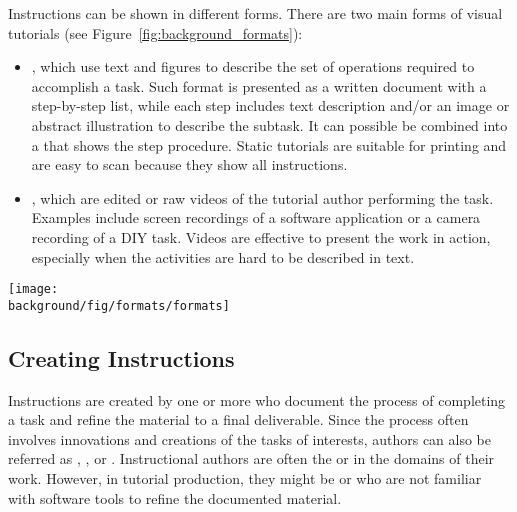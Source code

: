 Instructions can be shown in different forms. There are two main forms of visual tutorials (see Figure~\ref{fig:background_formats}):
\begin{itemize}
  \itemsep -2pt
  \item {}, which use text and figures to describe the set of operations required to accomplish a task. Such format is presented as a written document with a step-by-step list, while each step includes text description and/or an image or abstract illustration to describe the subtask. It can possible be combined into a  that shows the step procedure. Static tutorials are suitable for printing and are easy to scan because they show all instructions.
  \item {}, which are edited or raw videos of the tutorial author performing the task. Examples include screen recordings of a software application or a camera recording of a DIY task. Videos are effective to present the work in action, especially when the activities are hard to be described in text.
\end{itemize}

\begin{figure*}[t]
  \centering
  \begin{minipage}{\textwidth}
  \texttt{[image: \\background/fig/formats/formats]}
  \caption[formats]{Major tutorial formats:
  a) Step-by-step static tutorials show a list of steps, each with text and figure(s) that describe a subtask
  \footnote{Combine photos on the go \url{https://helpx.adobe.com/mobile-apps/how-to/combine-photos-photoshop-mix.html}}, and
  b) video tutorials show an author performing the task, which can be reviewed via a video player
  \footnote{Change the color of an object \url{https://helpx.adobe.com/photoshop/how-to/change-color-object-photoshop.html}}.
  }
  \label{fig:background_formats}
  \end{minipage}
\end{figure*}


\subsection{Creating Instructions}
Instructions are created by one or more  who document the process of completing a task and refine the material to a final deliverable.
%
Since the process often involves innovations and creations of the tasks of interests, authors can also be referred as , , or .
%
Instructional authors are often the  or  in the domains of their work. However, in tutorial production, they might be  or  who are not familiar with software tools to refine the documented material.

